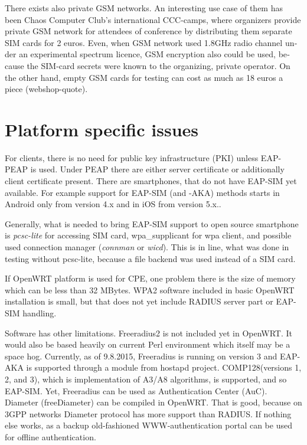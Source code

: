 \documentclass[12pt,a4paper,english]{tutthesis}
\begin{document}
\begin{otherlanguage}{english}
There exists also private GSM networks. An interesting use case
of them  has been Chaos Computer Club's international 
CCC-camps\cite{ccc}, where organizers 
provide private GSM network for attendees of conference
by distributing them separate SIM cards for 2 euros.  Even, when GSM
network used 1.8GHz radio channel under an experimental spectrum
licence,  GSM encryption also could be used, because the SIM-card secrets were known
to the organizing, private operator.
On the other hand, empty GSM cards for testing can cost as much as 
18 euros a piece (webshop-quote\cite{smartjac-testsim}).


\section{Platform specific issues}
\label{sec-6-4}

For clients, there is no need for public key infrastructure (PKI) 
unless EAP-PEAP is used. Under PEAP there are either server
certificate or additionally client certificate present.
There are smartphones, that do not have EAP-SIM yet available.
For example support for
EAP-SIM (and -AKA) methods starts in Android only from version 4.x and in
iOS from version 5.x.\cite{sim-support}.


Generally, what is  needed to bring EAP-SIM support to open source
smartphone is \emph{pcsc-lite} for accessing SIM card, wpa\_supplicant for
wpa client, and possible used connection manager (\emph{connman} or
\emph{wicd}). This is in line, what was done in testing without pcsc-lite,
because a file backend was used instead of a SIM card.





If OpenWRT platform  is used for CPE, one problem there is the size of
memory which can be less than 32 MBytes.
WPA2 software included in basic OpenWRT installation is small,
but that does not yet include RADIUS server part or EAP-SIM handling.


Software has other limitations. Freeradius2 is not included yet in OpenWRT.
It would also be based heavily on current Perl environment which
itself may be a space hog. 
Currently, as of 9.8.2015, Freeradius is running on version 3 and
EAP-AKA is supported through a module from hostapd project.
COMP128(versions 1, 2, and 3), which is implementation  of A3/A8
algorithms, is  supported\cite{freeradius2}, and so EAP-SIM.
Yet, Freeradius can be used as Authentication Center (AuC).
Diameter (freeDiameter) can be compiled in OpenWRT. That is good,
because on 3GPP networks Diameter protocol has more support than RADIUS.
If nothing else works, as a backup old-fashioned WWW-authentication
portal can be used for offline authentication.



\end{otherlanguage}
\end{document}
